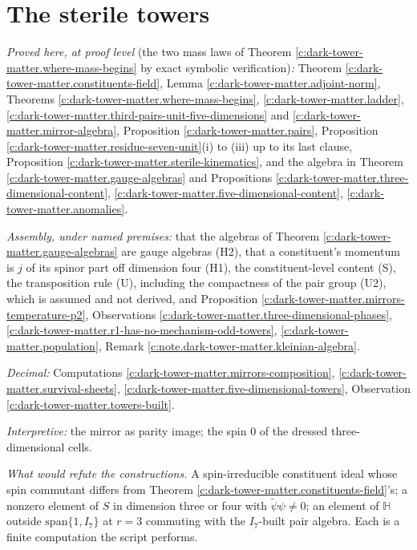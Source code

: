 \documentclass[11pt]{article}
\theoremstyle{definition}
\theoremstyle{plain}
\providecommand{\HH}{}\renewcommand{\HH}{\mathbb{H}}
\providecommand{\rev}{}\renewcommand{\rev}[1]{\widetilde{#1}}
\begin{document}
\section{The sterile towers}

\label{c:note.dark-tower-matter.setting-what-note-depends-what-would}
\emph{Proved here, at proof level} (the two mass laws of Theorem \ref{c:dark-tower-matter.where-mass-begins} by exact symbolic verification)\emph{:} Theorem \ref{c:dark-tower-matter.constituents-field}, Lemma \ref{c:dark-tower-matter.adjoint-norm}, Theorems \ref{c:dark-tower-matter.where-mass-begins}, \ref{c:dark-tower-matter.ladder}, \ref{c:dark-tower-matter.third-pairs-unit-five-dimensions} and \ref{c:dark-tower-matter.mirror-algebra}, Proposition \ref{c:dark-tower-matter.pairs}, Proposition \ref{c:dark-tower-matter.residue-seven-unit}(i) to (iii) up to its last clause, Proposition \ref{c:dark-tower-matter.sterile-kinematics}, and the algebra in Theorem \ref{c:dark-tower-matter.gauge-algebras} and Propositions \ref{c:dark-tower-matter.three-dimensional-content}, \ref{c:dark-tower-matter.five-dimensional-content}, \ref{c:dark-tower-matter.anomalies}.

\emph{Assembly, under named premises:} that the algebras of Theorem \ref{c:dark-tower-matter.gauge-algebras} are gauge algebras (H2), that a constituent's momentum is $j$ of its spinor part off dimension four (H1), the constituent-level content (S), the transposition rule (U), including the compactness of the pair group (U2), which is assumed and not derived, and Proposition \ref{c:dark-tower-matter.mirrors-temperature-p2}, Observations \ref{c:dark-tower-matter.three-dimensional-phases}, \ref{c:dark-tower-matter.r1-has-no-mechanism-odd-towers}, \ref{c:dark-tower-matter.population}, Remark \ref{c:note.dark-tower-matter.kleinian-algebra}.

\emph{Decimal:} Computations \ref{c:dark-tower-matter.mirrors-composition}, \ref{c:dark-tower-matter.survival-sheets}, \ref{c:dark-tower-matter.five-dimensional-towers}, Observation \ref{c:dark-tower-matter.towers-built}.

\emph{Interpretive:} the mirror as parity image; the spin $0$ of the dressed three-dimensional cells.

\emph{What would refute the constructions.} A spin-irreducible constituent ideal whose spin commutant differs from Theorem \ref{c:dark-tower-matter.constituents-field}'s; a nonzero element of $S$ in dimension three or four with $\rev{\psi}\psi \neq 0$; an element of $\HH$ outside $\mathrm{span}\{1, I_{7}\}$ at $r = 3$ commuting with the $I_{7}$-built pair algebra. Each is a finite computation the script performs.
\end{document}
